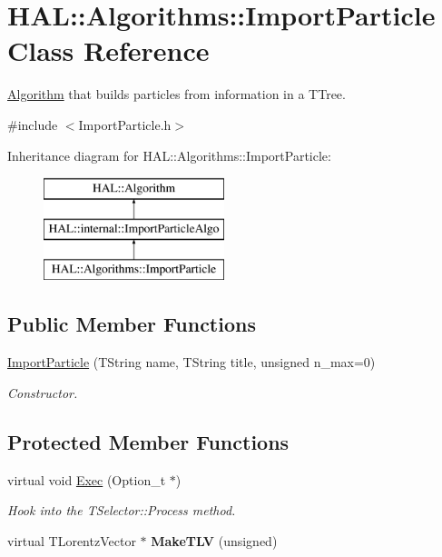\hypertarget{class_h_a_l_1_1_algorithms_1_1_import_particle}{\section{H\+A\+L\+:\+:Algorithms\+:\+:Import\+Particle Class Reference}
\label{class_h_a_l_1_1_algorithms_1_1_import_particle}
}


\hyperlink{class_h_a_l_1_1_algorithm}{Algorithm} that builds particles from information in a T\+Tree.  




{\ttfamily \#include $<$Import\+Particle.\+h$>$}

Inheritance diagram for H\+A\+L\+:\+:Algorithms\+:\+:Import\+Particle\+:\begin{figure}[H]
\begin{center}
\leavevmode
\includegraphics[height=3.000000cm]{class_h_a_l_1_1_algorithms_1_1_import_particle}
\end{center}
\end{figure}
\subsection*{Public Member Functions}
\begin{DoxyCompactItemize}
\item 
\hyperlink{class_h_a_l_1_1_algorithms_1_1_import_particle_ab42dcac49ed8ae1f565346ec7372c7a5}{Import\+Particle} (T\+String name, T\+String title, unsigned n\+\_\+max=0)
\begin{DoxyCompactList}\small\item\em Constructor. \end{DoxyCompactList}\end{DoxyCompactItemize}
\subsection*{Protected Member Functions}
\begin{DoxyCompactItemize}
\item 
virtual void \hyperlink{class_h_a_l_1_1_algorithms_1_1_import_particle_a1e5924b9deb6c7d1c1d1734b8cb510cb}{Exec} (Option\+\_\+t $\ast$)
\begin{DoxyCompactList}\small\item\em Hook into the T\+Selector\+::\+Process method. \end{DoxyCompactList}\item 
\hypertarget{class_h_a_l_1_1_algorithms_1_1_import_particle_abad1a5a9b44becfae4e4a7113edc80eb}{virtual T\+Lorentz\+Vector $\ast$ {\bfseries Make\+T\+L\+V} (unsigned)}\label{class_h_a_l_1_1_algorithms_1_1_import_particle_abad1a5a9b44becfae4e4a7113edc80eb}

\end{DoxyCompactItemize}


